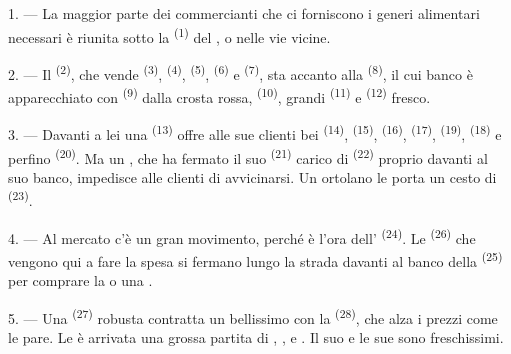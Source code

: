 \VUsaut{4.0mm}
\VUsaut{3.0mm}

\VUsaut{3.0mm}

1. --- La maggior parte dei commercianti che ci forniscono i generi alimentari
necessari è riunita sotto la  \textsuperscript{(1)} del
, o nelle vie vicine.

2. --- Il  \textsuperscript{(2)}, che vende 
\textsuperscript{(3)},  \textsuperscript{(4)},
 \textsuperscript{(5)}, 
\textsuperscript{(6)} e  \textsuperscript{(7)}, sta accanto alla
 \textsuperscript{(8)}, il cui banco è
apparecchiato con  \textsuperscript{(9)} dalla crosta rossa,
 \textsuperscript{(10)}, grandi 
\textsuperscript{(11)} e  \textsuperscript{(12)} fresco.

3. --- Davanti a lei una  \textsuperscript{(13)} offre alle sue
clienti bei  \textsuperscript{(14)}, 
\textsuperscript{(15)},  \textsuperscript{(16)}, 
\textsuperscript{(17)},  \textsuperscript{(19)}, 
\textsuperscript{(18)} e perfino  \textsuperscript{(20)}. Ma un
, che ha fermato il suo 
\textsuperscript{(21)} carico di  \textsuperscript{(22)} proprio
davanti al suo banco, impedisce alle clienti di avvicinarsi. Un ortolano le porta un
cesto di  \textsuperscript{(23)}.

\VUsaut{4.0mm}
\VUsaut{3.0mm}

4. --- Al mercato c'è un gran movimento, perché è l'ora dell'
\textsuperscript{(24)}. Le  \textsuperscript{(26)} che vengono qui a
fare la spesa si fermano lungo la strada davanti al banco della
 \textsuperscript{(25)} per comprare la  o una
.

5. --- Una  \textsuperscript{(27)} robusta contratta un bellissimo
 con la  \textsuperscript{(28)}, che alza i prezzi
come le pare. Le è arrivata una grossa partita di ,
,  e . Il suo  e le sue
 sono freschissimi.

